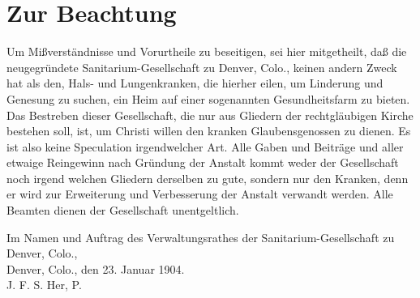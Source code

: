 \chapter{Zur Beachtung}

Um Mißverständnisse und Vorurtheile zu beseitigen, sei hier mitgetheilt, daß die neugegründete Sanitarium-Gesellschaft zu Denver, Colo., keinen andern Zweck hat als den, Hals- und Lungenkranken, die hierher eilen, um Linderung und Genesung zu suchen, ein Heim auf einer sogenannten Gesundheitsfarm zu bieten. Das Bestreben dieser Gesellschaft, die nur aus Gliedern der rechtgläubigen Kirche bestehen soll, ist, um Christi willen den kranken Glaubensgenossen zu dienen. Es ist also keine Speculation irgendwelcher Art. Alle Gaben und Beiträge und aller etwaige Reingewinn nach Gründung der Anstalt kommt weder der Gesellschaft noch irgend welchen Gliedern derselben zu gute, sondern nur den Kranken, denn er wird zur Erweiterung und Verbesserung der Anstalt verwandt werden. Alle Beamten dienen der Gesellschaft unentgeltlich.

\begin{unterschrift}
Im Namen und Auftrag des Verwaltungsrathes der Sanitarium-Gesellschaft zu Denver, Colo.,\\
Denver, Colo., den 23. Januar 1904.\\
J. F. S. Her, P.
\end{unterschrift}
